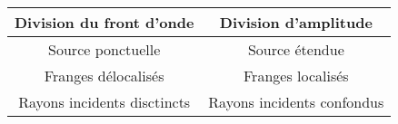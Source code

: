 ﻿\documentclass[a4paper]{article}
\begin{document}
\pagestyle{fancy}
\fancyhf{}
\setlength{\headheight}{15pt}

\begin{center}
	\large{}
\end{center}


\begin{table}[h!]
	\centering
		\begin{tabular}{|c c|}
		\hline
		Division du front d'onde & Division d'amplitude \\ [0.5ex]
		\hline\hline
		Source ponctuelle & Source étendue \\
		Franges délocalisés & Franges localisés \\
		Rayons incidents disctincts & Rayons incidents confondus \\ [.5ex]
		\hline
	\end{tabular}
\end{table}
\end{document}

